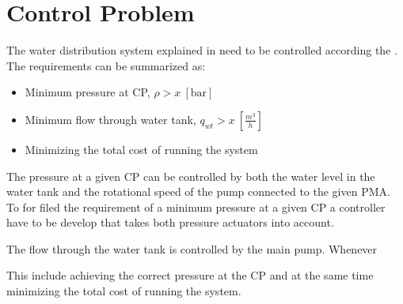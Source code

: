 \section{Control Problem}
\label{control_problem}

The water distribution system explained in  need to be controlled according the . The requirements can be summarized as: 

\begin{itemize}
	\item Minimum pressure at CP, $\rho > x \:[\text{bar}]$
	\item Minimum flow through water tank, $q_{wt} > x \:[\frac{m^3}{h}]$
	\item Minimizing the total cost of running the system
\end{itemize}

The pressure at a given CP can be controlled by both the water level in the water tank and the rotational speed of the pump connected to the given PMA. To for filed the requirement of a minimum pressure at a given CP a controller have to be develop that takes both pressure actuators into account. 

The flow through the water tank is controlled by the main pump. Whenever  

This include achieving the correct pressure at the CP and at the same time minimizing the total cost of running the system. 